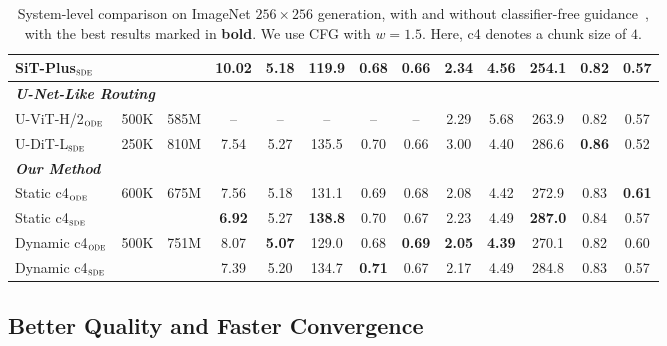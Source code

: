 \documentclass{llmxive}
\begin{document}
\begin{table}[t]
{\begin{tabular}{lcc|ccccc|ccccc}
SiT-Plus$_{\textsc{sde}}$
& 
& 
& 10.02 & 5.18 & 119.9 & 0.68 & 0.66
& 2.34 & 4.56 & 254.1 & 0.82 & 0.57 \\

\midrule
\multicolumn{13}{l}{\textit{\textbf{U-Net-Like Routing}}} \\
\midrule

U-ViT-H/2$_{\textsc{ode}}$
& 500K
& 585M
& -- & -- & -- & -- & --
& 2.29 & 5.68 & 263.9 & 0.82 & 0.57 \\

U-DiT-L$_{\textsc{sde}}$
& 250K
& 810M
& 7.54 & 5.27 & 135.5 & 0.70 & 0.66
& 3.00 & 4.40 & 286.6 & \textbf{0.86} & 0.52 \\

\midrule
\multicolumn{13}{l}{\textit{\textbf{Our Method}}} \\
\midrule

Static c4$_{\textsc{ode}}$
& \multirow{2}{*}{600K}
& \multirow{2}{*}{675M}
& 7.56 & 5.18 & 131.1 & 0.69 & 0.68
& 2.08 & 4.42 & 272.9 & 0.83 & \textbf{0.61} \\

Static c4$_{\textsc{sde}}$
& 
& 
& \textbf{6.92} & 5.27 & \textbf{138.8} & 0.70 & 0.67
& 2.23 & 4.49 & \textbf{287.0} & 0.84 & 0.57 \\

Dynamic c4$_{\textsc{ode}}$
& \multirow{2}{*}{500K}
& \multirow{2}{*}{751M}
& 8.07 & \textbf{5.07} & 129.0 & 0.68 & \textbf{0.69}
& \textbf{2.05} & \textbf{4.39} & 270.1 & 0.82 & 0.60 \\

Dynamic c4$_{\textsc{sde}}$
& 
& 
& 7.39 & 5.20 & 134.7 & \textbf{0.71} & 0.67
& 2.17 & 4.49 & 284.8 & 0.83 & 0.57 \\

\bottomrule
\end{tabular}
}
\caption{
System-level comparison on ImageNet $256 \times 256$ generation, with and without classifier-free guidance~\citep{ho2022classifier}, with the best results marked in \textbf{bold}. We use CFG with $w=1.5$. Here, c4 denotes a chunk size of $4$.
}
\label{tab:imagenet256_main}
\vspace{-0.8em}
\end{table}


\subsection{Better Quality and Faster Convergence}
\label{sec:exp_quality_speed}
\end{document}
